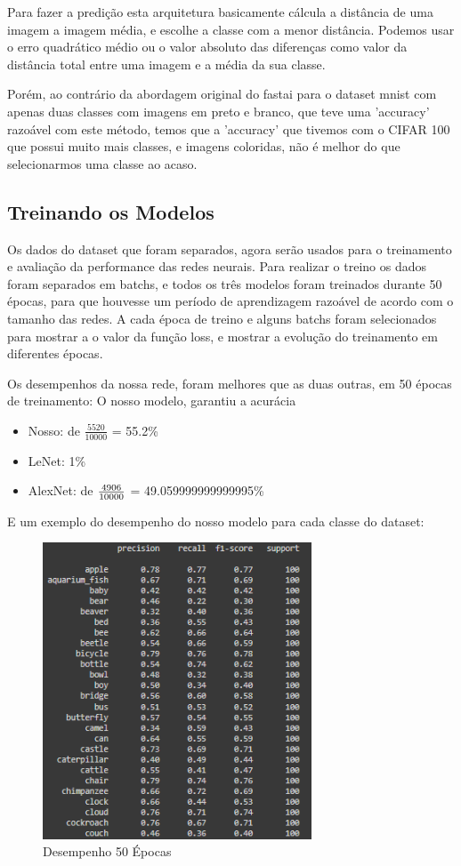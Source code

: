 \documentclass[conference]{IEEEtran}
\begin{document}
Para fazer a predição esta arquitetura basicamente cálcula a distância de uma imagem a imagem média,
e escolhe a classe com a menor distância.
Podemos usar o erro quadrático médio ou o valor absoluto das diferenças como valor da distância total entre uma imagem e a média da sua classe.

Porém, ao contrário da abordagem original do fastai para o dataset mnist com apenas duas classes com imagens em preto e branco, 
que teve uma 'accuracy' razoável com este método, temos que a 'accuracy' que tivemos com o CIFAR 100 que possui muito mais classes,
e imagens coloridas, não é melhor do que selecionarmos uma classe ao acaso.

\subsection{Treinando os Modelos}
Os dados do dataset que foram separados, agora serão usados para o treinamento e avaliação da performance das redes neurais.
Para realizar o treino os dados foram separados em batchs, e todos os três modelos foram treinados durante 50 épocas, para que houvesse um período de aprendizagem razoável de acordo com o tamanho das redes.
A cada época de treino e alguns batchs foram selecionados para mostrar a o valor da função loss, e mostrar a evolução do treinamento em diferentes épocas.

Os desempenhos da nossa rede, foram melhores que as duas outras, em 50 épocas de treinamento:
O nosso modelo, garantiu a acurácia

\begin{itemize}
	\item Nosso: de $\frac{5520}{10000}$ = 55.2\%
	\item LeNet: 1\%
	\item AlexNet: de ${4906 \over 10000}$ = 49.059999999999995\%
\end{itemize}

E um exemplo do desempenho do nosso modelo para cada classe do dataset:
\begin{figure}[h]
	\centerline{\includegraphics[width=8cm]{Images/treinamento2.png}}
	
	\caption{\label{fig:fig2}Desempenho 50 Épocas}
\end{figure}
\end{document}

